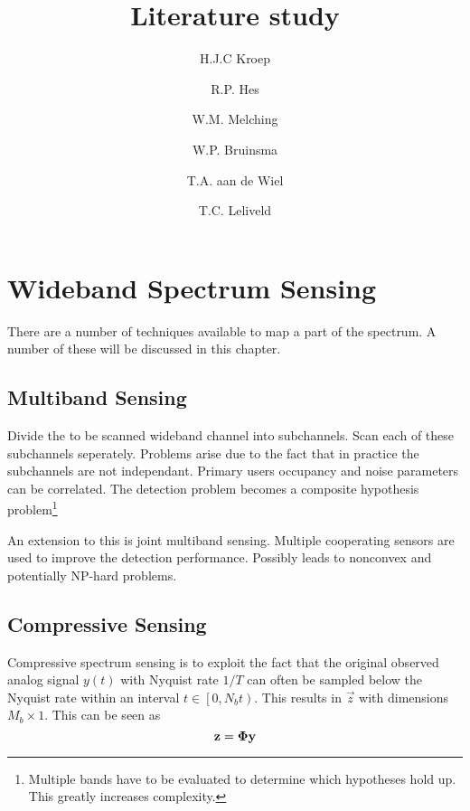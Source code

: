 \documentclass[report]{memoir}
\title{Literature study}
\author{H.J.C Kroep \and R.P. Hes \and W.M. Melching \and W.P. Bruinsma \and T.A. aan de Wiel \and T.C. Leliveld}
\begin{document}
\chapter{Wideband Spectrum Sensing}
There are a number of techniques available to map a part of the spectrum. A number of these will be discussed in this chapter.

\section{Multiband Sensing}
Divide the to be scanned wideband channel into subchannels. Scan each of these subchannels seperately. Problems arise due to the fact that in practice the subchannels are not independant. Primary users occupancy and noise parameters can be correlated. The detection problem becomes a composite hypothesis problem\footnote{Multiple bands have to be evaluated to determine which hypotheses hold up. This greatly increases complexity.}

An extension to this is joint multiband sensing. Multiple cooperating sensors are used to improve the detection performance. Possibly leads to nonconvex and potentially NP-hard problems.

\section{Compressive Sensing}
Compressive spectrum sensing is to exploit the fact that the original observed analog signal $y(t)$ with Nyquist rate $1/T$ can often be sampled below the Nyquist rate within an interval $t\in \left[0,N_{b}t \right)$. This results in $\vec{z}$ with dimensions $M_b \times 1$. This can be seen as 
\begin{equation}
    \label{nonuniformsampling}
    \boldsymbol{\mathbf{z}} = \boldsymbol{\mathbf{\Phi}}\boldsymbol{\mathbf{y}}
\end{equation}
\end{document}
